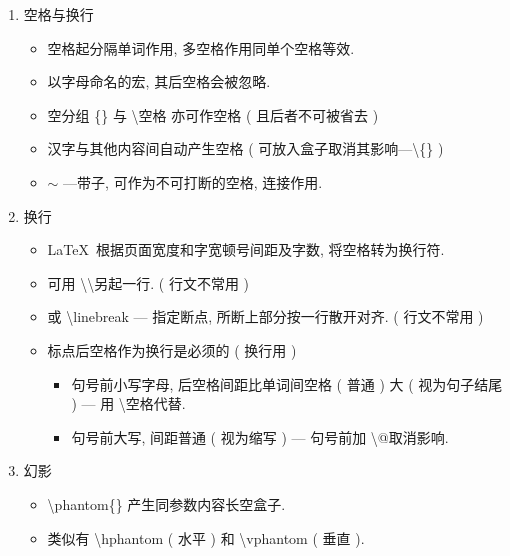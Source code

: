 \documentclass[UTF8]{ctexart}
\begin{document}
            \begin{enumerate}

                \item 空格与换行
                \begin{itemize}
                    \item 空格起分隔单词作用, 多空格作用同单个空格等效. 
                    \item 以字母命名的宏, 其后空格会被忽略. 
                    \item 空分组 \{\} 与 \textbackslash 空格 亦可作空格 ( 且后者不可被省去 )
                    \item 汉字与其他内容间自动产生空格 ( 可放入盒子取消其影响---\textbackslash \{\} )
                    \item $\sim$ ---带子, 可作为不可打断的空格, 连接作用. 
                \end{itemize}

                \item 换行
                \begin{itemize}
                    \item \LaTeX\ 根据页面宽度和字宽顿号间距及字数, 将空格转为换行符. 
                    \item 可用 \textbackslash\textbackslash 另起一行. ( 行文不常用 )
                    \item 或 \textbackslash linebreak --- 指定断点, 所断上部分按一行散开对齐. ( 行文不常用 )
                    \item 标点后空格作为换行是必须的 ( 换行用 )
                    \begin{itemize}
                        \item 句号前小写字母, 后空格间距比单词间空格 ( 普通 ) 大 ( 视为句子结尾 ) --- 用 \textbackslash 空格代替. 
                        \item 句号前大写, 间距普通 ( 视为缩写 ) --- 句号前加 \textbackslash @取消影响. 
                    \end{itemize}
                \end{itemize}

                \item 幻影
                \begin{itemize}
                    \item \textbackslash phantom\{\} 产生同参数内容长空盒子.
                    \item 类似有 \textbackslash hphantom ( 水平 ) 和 \textbackslash vphantom ( 垂直 ). 
                \end{itemize}

            \end{enumerate}
\end{document}
